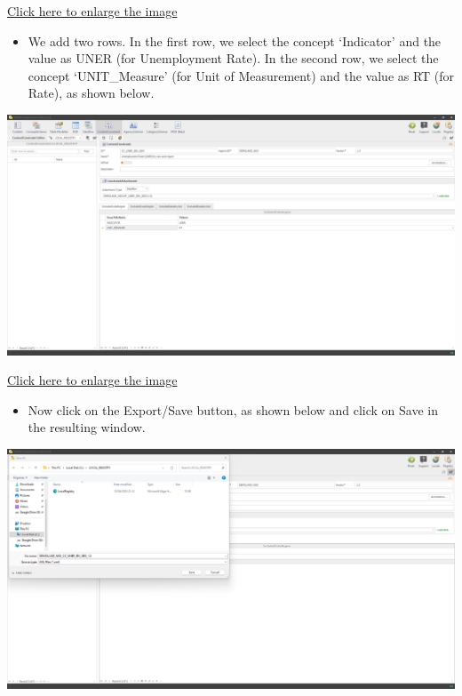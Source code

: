 \documentclass[
]{book}
\providecommand{\tightlist}{%
  \setlength{\itemsep}{0pt}\setlength{\parskip}{0pt}}
\begin{document}
\href{images/image274.png}{Click here to enlarge the image}

\begin{itemize}
\tightlist
\item
  We add two rows. In the first row, we select the concept `Indicator' and the value as UNER (for Unemployment Rate). In the second row, we select the concept `UNIT\_Measure' (for Unit of Measurement) and the value as RT (for Rate), as shown below.
\end{itemize}

\begin{center}\includegraphics[width=1\linewidth]{./images/image275} \end{center}

\href{images/image275.png}{Click here to enlarge the image}

\begin{itemize}
\tightlist
\item
  Now click on the Export/Save button, as shown below and click on Save in the resulting window.
\end{itemize}

\begin{center}\includegraphics[width=1\linewidth]{./images/image276} \end{center}
\end{document}
